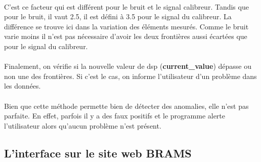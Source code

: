 \documentclass[11pt]{article}
\begin{document}
\\
C'est ce facteur qui est différent pour le bruit et le signal calibreur.
Tandis que pour le bruit, il vaut 2.5, il est défini à 3.5 pour le signal du calibreur.
La différence se trouve ici dans la variation des éléments mesurés.
Comme le bruit varie moins il n'est pas nécessaire d'avoir les deux frontières aussi écartées que pour le signal du calibreur.\\
\\
Finalement, on vérifie si la nouvelle valeur de dsp (\textbf{current\_value}) dépasse ou non une des frontières.
Si c'est le cas, on informe l'utilisateur d'un problème dans les données.\\
\\
Bien que cette méthode permette bien de détecter des anomalies, elle n'est pas parfaite.
En effet, parfois il y a des faux positifs et le programme alerte l'utilisateur alors qu'aucun problème n'est présent.

\subsection{L'interface sur le site web BRAMS}
\end{document}
